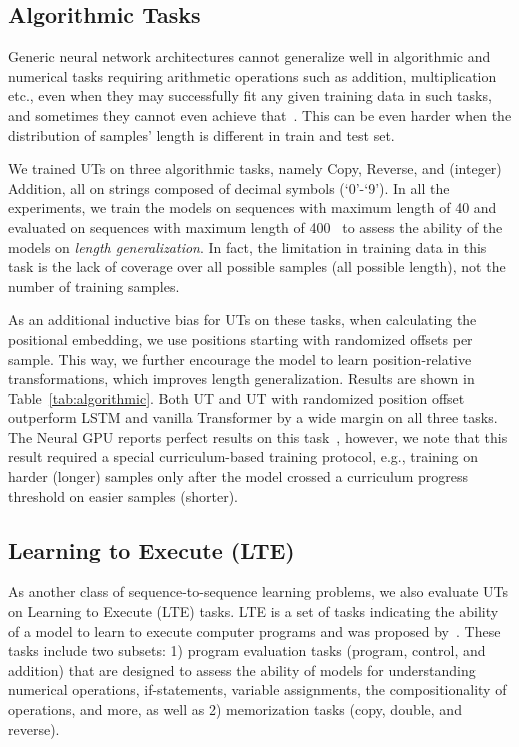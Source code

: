 \subsection{Algorithmic Tasks}
Generic neural network architectures cannot generalize well in algorithmic and numerical tasks requiring arithmetic operations such as addition, multiplication etc., even when they may successfully fit any given training data in such tasks, and sometimes they cannot even achieve that~\citep{trask2018neural}. This can be even harder when the distribution of samples' length is different in train and test set.

We trained UTs on three algorithmic tasks, namely Copy, Reverse, and (integer) Addition, all on strings composed of decimal symbols (`0'-`9'). In all the experiments, we train the models on sequences with maximum length of 40 and evaluated on sequences with maximum length of 400~\citep{neural_gpu} to assess the ability of the models on \emph{length generalization}. In fact, the limitation in training data in this task is the lack of coverage over all possible samples (all possible length), not the number of training samples.

As an additional inductive bias for UTs on these tasks, when calculating the positional embedding, we use positions starting with randomized offsets per sample. This way, we further encourage the model to learn position-relative transformations, which improves length generalization.
Results are shown in Table~\ref{tab:algorithmic}. Both UT and UT with randomized position offset outperform LSTM and vanilla Transformer by a wide margin on all three tasks. 
The Neural GPU reports perfect results on this task~\citep{neural_gpu}, however, we note that this result required a special curriculum-based training protocol, e.g., training on harder (longer) samples only after the model crossed a curriculum progress threshold on easier samples (shorter). 



\subsection{Learning to Execute (LTE)}
As another class of sequence-to-sequence learning problems, we also evaluate UTs on Learning to Execute (LTE) tasks. 
LTE is a set of tasks indicating the ability of a model to learn to execute computer programs and was proposed by~\citet{ZS14}. These tasks include two subsets: 1) program evaluation tasks (program, control, and addition) that are designed to assess the ability of models for understanding numerical operations, if-statements, variable assignments, the compositionality of operations, and more, as well as 2) memorization tasks (copy, double, and reverse). 

